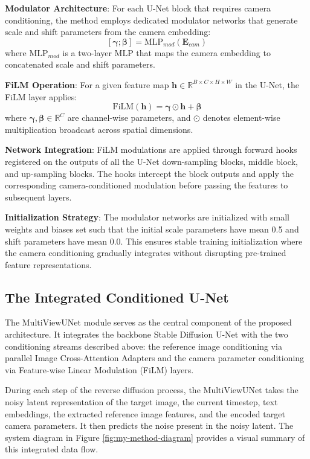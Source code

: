 \textbf{Modulator Architecture}: For each U-Net block that requires camera conditioning, the method employs dedicated modulator networks that generate scale and shift parameters from the camera embedding:
\[ [\boldsymbol{\gamma}; \boldsymbol{\beta}] = \text{MLP}_{mod}(\mathbf{E}_{cam}) \]
where $\text{MLP}_{mod}$ is a two-layer MLP that maps the camera embedding to concatenated scale and shift parameters.

\textbf{FiLM Operation}: For a given feature map $\mathbf{h} \in \mathbb{R}^{B \times C \times H \times W}$ in the U-Net, the FiLM layer applies:
\[ \text{FiLM}(\mathbf{h}) = \boldsymbol{\gamma} \odot \mathbf{h} + \boldsymbol{\beta} \]
where $\boldsymbol{\gamma}, \boldsymbol{\beta} \in \mathbb{R}^C$ are channel-wise parameters, and $\odot$ denotes element-wise multiplication broadcast across spatial dimensions.

\textbf{Network Integration}: FiLM modulations are applied through forward hooks registered on the outputs of all the U-Net down-sampling blocks, middle block, and up-sampling blocks. The hooks intercept the block outputs and apply the corresponding camera-conditioned modulation before passing the features to subsequent layers.

\textbf{Initialization Strategy}: The modulator networks are initialized with small weights and biases set such that the initial scale parameters have mean 0.5 and shift parameters have mean 0.0. This ensures stable training initialization where the camera conditioning gradually integrates without disrupting pre-trained feature representations.

\subsection{The Integrated Conditioned U-Net}
The $\text{MultiViewUNet}$ module serves as the central component of the proposed architecture. It integrates the backbone Stable Diffusion U-Net with the two conditioning streams described above: the reference image conditioning via parallel Image Cross-Attention Adapters and the camera parameter conditioning via Feature-wise Linear Modulation (FiLM) layers.

During each step of the reverse diffusion process, the $\text{MultiViewUNet}$ takes the noisy latent representation of the target image, the current timestep, text embeddings, the extracted reference image features, and the encoded target camera parameters. It then predicts the noise present in the noisy latent. The system diagram in Figure \ref{fig:my-method-diagram} provides a visual summary of this integrated data flow.

